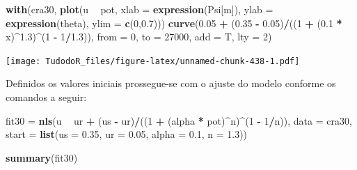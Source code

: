 \documentclass[
]{book}
\newenvironment{Shaded}{\begin{snugshade}}{\end{snugshade}}
\newcommand{\DataTypeTok}[1]{\textcolor[rgb]{0.13,0.29,0.53}{#1}}
\newcommand{\DecValTok}[1]{\textcolor[rgb]{0.00,0.00,0.81}{#1}}
\newcommand{\FloatTok}[1]{\textcolor[rgb]{0.00,0.00,0.81}{#1}}
\newcommand{\KeywordTok}[1]{\textcolor[rgb]{0.13,0.29,0.53}{\textbf{#1}}}
\newcommand{\NormalTok}[1]{#1}
\newcommand{\OperatorTok}[1]{\textcolor[rgb]{0.81,0.36,0.00}{\textbf{#1}}}
\newcommand{\StringTok}[1]{\textcolor[rgb]{0.31,0.60,0.02}{#1}}
\begin{document}
\begin{Shaded}
\begin{Highlighting}[]
\KeywordTok{with}\NormalTok{(cra30, }\KeywordTok{plot}\NormalTok{(u }\OperatorTok{~}\StringTok{ }\NormalTok{pot, }\DataTypeTok{xlab =} \KeywordTok{expression}\NormalTok{(Psi[m]), }
                 \DataTypeTok{ylab =} \KeywordTok{expression}\NormalTok{(theta),}
                 \DataTypeTok{ylim =} \KeywordTok{c}\NormalTok{(}\DecValTok{0}\NormalTok{,}\FloatTok{0.7}\NormalTok{))) }
        \KeywordTok{curve}\NormalTok{(}\FloatTok{0.05} \OperatorTok{+}\StringTok{ }\NormalTok{(}\FloatTok{0.35} \OperatorTok{-}\StringTok{ }\FloatTok{0.05}\NormalTok{)}\OperatorTok{/}\NormalTok{((}\DecValTok{1} \OperatorTok{+}\StringTok{ }\NormalTok{(}\FloatTok{0.1} \OperatorTok{*}\StringTok{ }\NormalTok{x)}\OperatorTok{^}\FloatTok{1.3}\NormalTok{)}\OperatorTok{^}\NormalTok{(}\DecValTok{1} \OperatorTok{-}\StringTok{ }\DecValTok{1}\OperatorTok{/}\FloatTok{1.3}\NormalTok{)), }\DataTypeTok{from =} \DecValTok{0}\NormalTok{, }
  \DataTypeTok{to =} \DecValTok{27000}\NormalTok{, }\DataTypeTok{add =}\NormalTok{ T, }\DataTypeTok{lty =} \DecValTok{2}\NormalTok{)}
\end{Highlighting}
\end{Shaded}

\texttt{[image: TudodoR\_files/figure-latex/unnamed-chunk-438-1.pdf]}

Definidos os valores iniciais prossegue-se com o ajuste do modelo conforme os comandos a seguir:

\begin{Shaded}
\begin{Highlighting}[]
\NormalTok{fit30 =}\StringTok{ }\KeywordTok{nls}\NormalTok{(u }\OperatorTok{~}\StringTok{ }\NormalTok{ur }\OperatorTok{+}\StringTok{ }\NormalTok{(us }\OperatorTok{-}\StringTok{ }\NormalTok{ur)}\OperatorTok{/}\NormalTok{((}\DecValTok{1} \OperatorTok{+}\StringTok{ }\NormalTok{(alpha }\OperatorTok{*}\StringTok{ }\NormalTok{pot)}\OperatorTok{^}\NormalTok{n)}\OperatorTok{^}\NormalTok{(}\DecValTok{1} \OperatorTok{-}\StringTok{ }\DecValTok{1}\OperatorTok{/}\NormalTok{n)), }\DataTypeTok{data =}\NormalTok{ cra30, }\DataTypeTok{start =} \KeywordTok{list}\NormalTok{(}\DataTypeTok{us =} \FloatTok{0.35}\NormalTok{, }\DataTypeTok{ur =} \FloatTok{0.05}\NormalTok{, }\DataTypeTok{alpha =} \FloatTok{0.1}\NormalTok{, }\DataTypeTok{n =} \FloatTok{1.3}\NormalTok{))}

\KeywordTok{summary}\NormalTok{(fit30)}
\end{Highlighting}
\end{Shaded}
\end{document}
